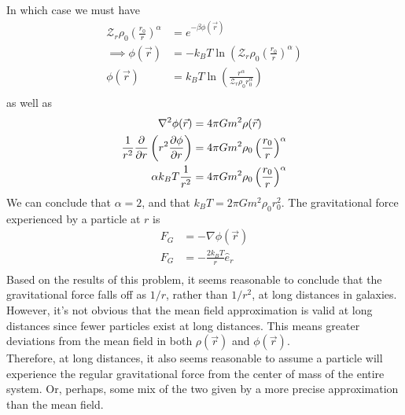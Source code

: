 \documentclass[]{book}
\begin{document}
\begin{enumerate}[1)]
\begin{enumerate}[a)]
\begin{equation}
\end{equation}
In which case we must have
\begin{equation}
\begin{split}
\mathcal{Z}_r\rho_0 \left(\frac{r_0}{r} \right)^\alpha & = e^{-\beta \phi(\vec{r})} \\
\implies \phi(\vec{r}) & = - k_BT \ln \left(\mathcal{Z}_r\rho_0 \left(\frac{r_0}{r} \right)^\alpha \right) \\
\phi(\vec{r}) & = k_BT \ln \left( \frac{r^\alpha}{  \mathcal{Z}_r\rho_0 r_0^\alpha}   \right) \\
\end{split}
\end{equation}
as well as \\
\begin{equation}
\begin{split}
\nabla^2\phi(\vec{r}) & = 4\pi Gm^2 \rho(\vec{r}) \\
\frac{1}{r^2}\pdv{r}\left( r^2 \pdv{\phi}{r} \right) & = 4\pi Gm^2 \rho_0 \left(\frac{r_0}{r} \right)^\alpha \\
\alpha k_BT \frac{1}{r^2} & = 4\pi Gm^2 \rho_0 \left(\frac{r_0}{r} \right)^\alpha \\
\end{split}
\end{equation}
We can conclude that $\alpha = 2$, and that $k_BT = 2\pi Gm^2 \rho_0 r_0^2$. The gravitational force experienced by a particle at $r$ is 
\begin{equation}
\begin{split}
F_G & = -\nabla \phi(\vec{r}) \\
F_G & = -\frac{2k_BT}{r} \hat{e}_r \\ 
\end{split}
\end{equation}
Based on the results of this problem, it seems reasonable to conclude that the gravitational force falls off as $1/r$, rather than $1/r^2$, at long distances in galaxies. However, it's not obvious that the mean field approximation is valid at long distances since fewer particles exist at long distances. This means greater deviations from the mean field in both $\rho(\vec{r})$ and $\phi(\vec{r})$. \\
Therefore, at long distances, it also seems reasonable to assume a particle will experience the regular gravitational force from the center of mass of the entire system. Or, perhaps, some mix of the two given by a more precise approximation than the mean field. 
\end{enumerate}

\end{enumerate}
\end{document}
